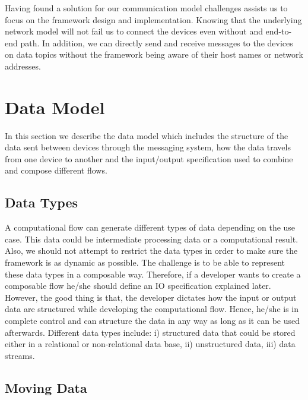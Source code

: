 \noindent Having found a solution for our communication model challenges assists us to focus on the framework design and implementation. Knowing that the underlying network model will not fail us to connect the devices even without and end-to-end path. In addition, we can directly send and receive messages to the devices on data topics without the framework being aware of their host names or network addresses.  




\section{Data Model}
In this section we describe the data model which includes the structure of the data sent between devices through the messaging system, how the data travels from one device to another and the input/output specification used to combine and compose different flows.

\subsection{Data Types}
A computational flow can generate different types of data depending on the use case. This data could be intermediate processing data or a computational result. Also, we should not attempt to restrict the data types in order to make sure the framework is as dynamic as possible. The challenge is to be able to represent these data types in a composable way. Therefore, if a developer wants to create a composable flow he/she should define an IO specification explained later. However, the good thing is that, the developer dictates how the input or output data are structured while developing the computational flow. Hence, he/she is in complete control and can structure the data in any way as long as it can be used afterwards.  Different data types include: i) structured data that could be stored either in a relational or non-relational data base, ii) unstructured data, iii)  data streams.

\subsection{Moving Data}

